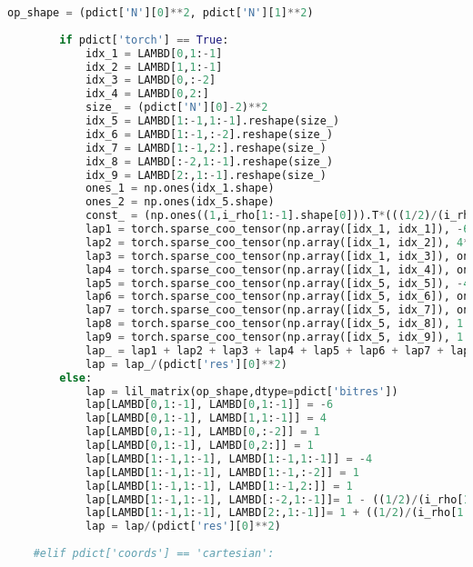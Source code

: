 \begin{lstlisting}[frame=single, language=Python]
        op_shape = (pdict['N'][0]**2, pdict['N'][1]**2)
        
        if pdict['torch'] == True:
            idx_1 = LAMBD[0,1:-1]
            idx_2 = LAMBD[1,1:-1]
            idx_3 = LAMBD[0,:-2]
            idx_4 = LAMBD[0,2:]
            size_ = (pdict['N'][0]-2)**2
            idx_5 = LAMBD[1:-1,1:-1].reshape(size_)
            idx_6 = LAMBD[1:-1,:-2].reshape(size_)
            idx_7 = LAMBD[1:-1,2:].reshape(size_)
            idx_8 = LAMBD[:-2,1:-1].reshape(size_)
            idx_9 = LAMBD[2:,1:-1].reshape(size_)
            ones_1 = np.ones(idx_1.shape)
            ones_2 = np.ones(idx_5.shape)
            const_ = (np.ones((1,i_rho[1:-1].shape[0])).T*(((1/2)/(i_rho[1:-1])))).reshape(size_)
            lap1 = torch.sparse_coo_tensor(np.array([idx_1, idx_1]), -6*ones_1, op_shape, dtype=torch.float32)
            lap2 = torch.sparse_coo_tensor(np.array([idx_1, idx_2]), 4*ones_1, op_shape, dtype=torch.float32)
            lap3 = torch.sparse_coo_tensor(np.array([idx_1, idx_3]), ones_1, op_shape, dtype=torch.float32)
            lap4 = torch.sparse_coo_tensor(np.array([idx_1, idx_4]), ones_1, op_shape, dtype=torch.float32)
            lap5 = torch.sparse_coo_tensor(np.array([idx_5, idx_5]), -4*ones_2, op_shape, dtype=torch.float32)
            lap6 = torch.sparse_coo_tensor(np.array([idx_5, idx_6]), ones_2, op_shape, dtype=torch.float32)
            lap7 = torch.sparse_coo_tensor(np.array([idx_5, idx_7]), ones_2, op_shape, dtype=torch.float32)
            lap8 = torch.sparse_coo_tensor(np.array([idx_5, idx_8]), 1 - const_, op_shape, dtype=torch.float32)
            lap9 = torch.sparse_coo_tensor(np.array([idx_5, idx_9]), 1 + const_, op_shape, dtype=torch.float32)
            lap_ = lap1 + lap2 + lap3 + lap4 + lap5 + lap6 + lap7 + lap8 + lap9
            lap = lap_/(pdict['res'][0]**2)  
        else:
            lap = lil_matrix(op_shape,dtype=pdict['bitres'])
            lap[LAMBD[0,1:-1], LAMBD[0,1:-1]] = -6
            lap[LAMBD[0,1:-1], LAMBD[1,1:-1]] = 4
            lap[LAMBD[0,1:-1], LAMBD[0,:-2]] = 1
            lap[LAMBD[0,1:-1], LAMBD[0,2:]] = 1
            lap[LAMBD[1:-1,1:-1], LAMBD[1:-1,1:-1]] = -4
            lap[LAMBD[1:-1,1:-1], LAMBD[1:-1,:-2]] = 1
            lap[LAMBD[1:-1,1:-1], LAMBD[1:-1,2:]] = 1
            lap[LAMBD[1:-1,1:-1], LAMBD[:-2,1:-1]]= 1 - ((1/2)/(i_rho[1:-1]))
            lap[LAMBD[1:-1,1:-1], LAMBD[2:,1:-1]]= 1 + ((1/2)/(i_rho[1:-1]))
            lap = lap/(pdict['res'][0]**2)
        
    #elif pdict['coords'] == 'cartesian':
        

\end{lstlisting}
